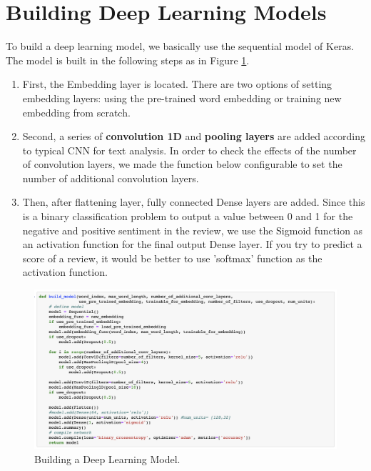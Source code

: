 \documentclass[11pt]{article}
\begin{document}
\section{Building Deep Learning Models}
\label{Building Deep Learning Models}

To build a deep learning model, we basically use the sequential model of Keras.
%
The model is built in the following steps as in Figure \ref{fig:building_model}.
\begin{enumerate}
	\item First, the Embedding layer is located. There are two options of setting embedding layers: using the pre-trained word embedding or training new embedding from scratch.
\item Second, a series of \textbf{convolution 1D} and \textbf{pooling layers} are added according to typical CNN for text analysis. 
%
In order to check the effects of the number of convolution layers, we made the function below configurable to set the number of additional convolution layers.
\item Then, after flattening layer, fully connected Dense layers are added.
Since this is a binary classification problem to output a value between 0 and 1 for the negative and positive sentiment in the review, we use the Sigmoid function as an activation function for the final output Dense layer. 
%
If you try to predict a score of a review, it would be better to use 'softmax' function as the activation function.

\end{enumerate}

\begin{figure}[h!]
\centering 
\includegraphics[width=\textwidth]{building_model.png}
\caption{Building a Deep Learning Model.}
  \label{fig:building_model}
\end{figure}
\end{document}

